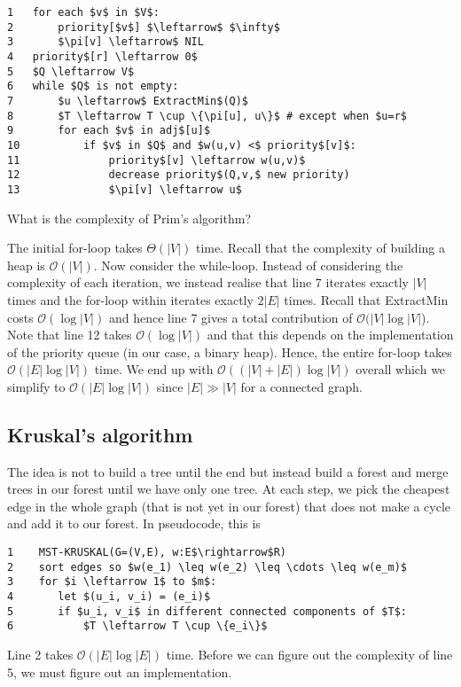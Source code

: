 \documentclass[11pt]{article}
\begin{document}
\begin{lstlisting}
1   for each $v$ in $V$: 
2       priority[$v$] $\leftarrow$ $\infty$ 
3       $\pi[v] \leftarrow$ NIL 
4   priority$[r] \leftarrow 0$
5   $Q \leftarrow V$
6   while $Q$ is not empty: 
7       $u \leftarrow$ ExtractMin$(Q)$
8       $T \leftarrow T \cup \{\pi[u], u\}$ # except when $u=r$
9       for each $v$ in adj$[u]$
10          if $v$ in $Q$ and $w(u,v) <$ priority$[v]$: 
11              priority$[v] \leftarrow w(u,v)$
12              decrease priority$(Q,v,$ new priority)
13              $\pi[v] \leftarrow u$
\end{lstlisting}

What is the complexity of Prim's algorithm?

The initial for-loop takes $\Theta(|V|)$ time. Recall that the complexity of building a heap is $\mathcal{O}(|V|)$. Now consider the while-loop. Instead of considering the complexity of each iteration, we instead realise that line 7 iterates exactly $|V|$ times and the for-loop within iterates exactly $2|E|$ times. Recall that ExtractMin costs $\mathcal{O}(\log |V|)$ and hence line 7 gives a total contribution of $\mathcal{O}(|V|\log |V|$). Note that line 12 takes $\mathcal{O}(\log |V|)$ and that this depends on the implementation of the priority queue (in our case, a binary heap). Hence, the entire for-loop takes $\mathcal{O}(|E|\log |V|)$ time. We end up with $\mathcal{O}((|V|+|E|)\log |V|)$ overall which we simplify to $\mathcal{O}(|E|\log |V|)$ since $|E| \gg |V|$ for a connected graph. 

\subsection{Kruskal's algorithm}
The idea is not to build a tree until the end but instead build a forest and merge trees in our forest until we have only one tree. At each step, we pick the cheapest edge in the whole graph (that is not yet in our forest) that does not make a cycle and add it to our forest. In pseudocode, this is 

\begin{lstlisting}
1    MST-KRUSKAL(G=(V,E), w:E$\rightarrow$R)
2    sort edges so $w(e_1) \leq w(e_2) \leq \cdots \leq w(e_m)$
3    for $i \leftarrow 1$ to $m$: 
4       let $(u_i, v_i) = (e_i)$
5       if $u_i, v_i$ in different connected components of $T$: 
6           $T \leftarrow T \cup \{e_i\}$
\end{lstlisting}

Line 2 takes $\mathcal{O}(|E|\log |E|)$ time. Before we can figure out the complexity of line 5, we must figure out an implementation. 
\end{document}
